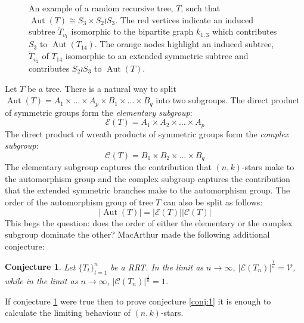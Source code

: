 \documentclass[oneside]{book} %
\newtheorem{con}[thm]{Conjecture}
\theoremstyle{definition}
\numberwithin{equation}{section}
\DeclareMathOperator{\Aut}{Aut} %
\begin{document}
\begin{figure}[ht]
\centering
{}
\caption{An example of a random recursive tree, $T$, such that $\Aut(T) \cong S_{3} \times S_{2}\wr S_{3}$.  
The red vertices indicate an induced subtree $\tilde{T}_{v_{1}}$ isomorphic to the bipartite graph $k_{1,3}$ which 
contributes $S_{3}$ to $\Aut(T_{14})$. The orange nodes highlight an induced subtree, $\tilde{T}_{v_{2}}$ of $T_{14}$ 
isomorphic to an extended symmetric subtree and contributes $S_{2}\wr S_{3}$ to $\Aut(T)$.}\label{fig2}
\end{figure}

Let $T$ be a tree.  There is a natural way to split $\Aut(T)= A_{1} \times\dots\times A_{p} \times B_{1} \times \dots \times B_{q}$ into two subgroups.  The direct product of symmetric groups form the \emph{elementary subgroup}:
\[
 \mathcal{E}(T) = A_{1} \times A_2 \times \dots\times A_{p}
\]
The direct product of wreath products of symmetric groups form the \emph{complex subgroup}:
\[
 \mathcal{C}(T) =  B_{1} \times B_2 \times \dots \times B_{q}
\]
The elementary subgroup captures the contribution that $(n,k)$-stars make to the automorphism group and the complex subgroup captures the contribution that the extended symmetric branches make to the automorphism group.  The order of the automorphism group of tree $T$ can also be split as follows:
\[
\lvert \Aut(T) \rvert  =  \lvert \mathcal{E}(T) \rvert\lvert \mathcal{C}(T)\rvert 
\]
This begs the question: does the order of either the elementary or the complex subgroup dominate the other?  MacArthur \cite{Bens} made the following additional conjecture:
\begin{con}\label{conj:2}
 Let $\{T_t\}_{t=1}^{n}$ be a RRT. In the limit as $n \rightarrow \infty$, $\lvert \mathcal{E}(T_n)\rvert^{\frac{1}{n}}  = \mathcal{V}$, while in the limit as $n \rightarrow \infty$, $\lvert \mathcal{C}(T_n)\rvert^{\frac{1}{n}}  = 1$.
 
 \end{con}
If conjecture \ref{conj:2} were true then to prove conjecture \ref{conj:1} it is enough to calculate the limiting behaviour of $(n,k)$-stars.  
\end{document}
